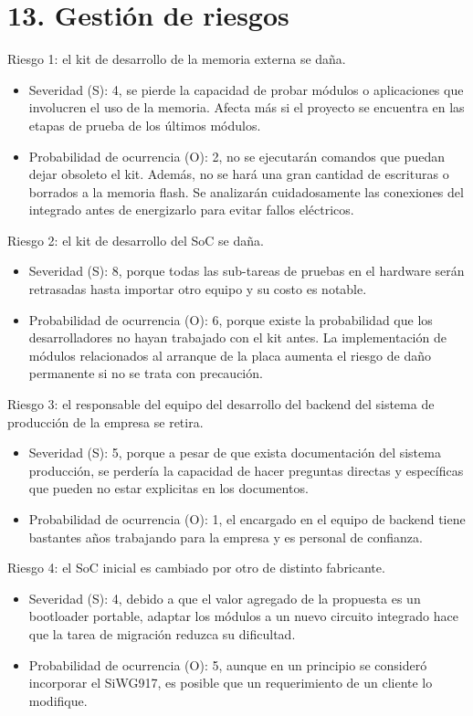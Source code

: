 \documentclass[
11pt, %
]{charter}
\begin{document}
\section{13. Gestión de riesgos}
\label{sec:riesgos}

Riesgo 1: el kit de desarrollo de la memoria externa se daña.
\begin{itemize}
	\item Severidad (S): 4, se pierde la capacidad de probar módulos o aplicaciones que involucren el uso de la memoria. Afecta más si el proyecto se encuentra
	en las etapas de prueba de los últimos módulos.
	\item Probabilidad de ocurrencia (O): 2, no se ejecutarán comandos que puedan dejar obsoleto el kit. Además, no se hará una gran cantidad de escrituras o borrados a la memoria flash. Se analizarán cuidadosamente las conexiones del integrado antes de energizarlo para evitar fallos eléctricos.
\end{itemize}   

Riesgo 2: el kit de desarrollo del SoC se daña.
\begin{itemize}
	\item Severidad (S): 8, porque todas las sub-tareas de pruebas en el hardware serán retrasadas hasta importar otro equipo y su costo es notable.
	\item Probabilidad de ocurrencia (O): 6, porque existe la probabilidad que los desarrolladores no hayan trabajado con el kit antes. La implementación de módulos relacionados al arranque de la placa aumenta el riesgo de daño permanente si no se trata con precaución.
\end{itemize}

Riesgo 3: el responsable del equipo del desarrollo del backend del sistema de producción de la empresa se retira.
\begin{itemize}
	\item Severidad (S): 5, porque a pesar de que exista documentación del sistema producción, se perdería la capacidad de hacer preguntas directas y específicas que pueden no estar explicitas en los documentos.
	\item Probabilidad de ocurrencia (O): 1, el encargado en el equipo de backend tiene bastantes años trabajando para la empresa y es personal de confianza.
\end{itemize}

Riesgo 4: el SoC inicial es cambiado por otro de distinto fabricante.
\begin{itemize}
	\item Severidad (S): 4, debido a que el valor agregado de la propuesta es un bootloader portable, adaptar los módulos a un nuevo circuito integrado hace que la tarea de migración reduzca su dificultad.
	\item Probabilidad de ocurrencia (O): 5, aunque en un principio se consideró incorporar el SiWG917, es posible que un requerimiento de un cliente lo modifique.
\end{itemize}
\end{document}
